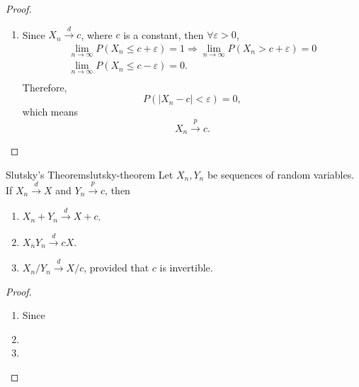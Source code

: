 \begin{proof}
\begin{enumerate}
        By the property of distribution (Theorem \ref{thm:distribution-function-property}), as $\varepsilon\rightarrow 0$, then
        \begin{equation*}
            \lim_{n\rightarrow\infty}F_n(x)=F(x),
        \end{equation*}
        which means,
        \begin{equation*}
            X_n\stackrel{d}{\rightarrow}X.
        \end{equation*}
        \item
        Since $X_{n}\stackrel{d}{\rightarrow}c$, where $c$ is a constant, then $\forall\varepsilon>0$,
        \begin{equation*}
            \begin{gathered}
                \lim_{n\rightarrow\infty}P(X_n\leq c+\varepsilon)=1\Rightarrow\lim_{n\rightarrow\infty}P(X_n>c+\varepsilon)=0\\
                \lim_{n\rightarrow\infty}P(X_n\leq c-\varepsilon)=0.\\
            \end{gathered}
        \end{equation*}
        Therefore,
        \begin{equation*}
            P\left(\left|X_n-c\right|<\varepsilon\right)=0,
        \end{equation*}
        which means
        \begin{equation*}
            X_n\stackrel{p}{\rightarrow}c.
        \end{equation*}
    \end{enumerate}
\end{proof}

\begin{theorem}{Slutsky's Theorem}{slutsky-theorem}
    Let $X_{n}, Y_{n}$ be sequences of random variables. If $X_{n}\stackrel{d}{\rightarrow}X$ and $Y_{n}\stackrel{p}{\rightarrow}c$, then
    \begin{enumerate}
        \item $X_{n}+Y_{n}\stackrel{d}{\rightarrow}X+c$.
        \item $X_{n}Y_{n}\stackrel{d}{\rightarrow}cX$.
        \item $X_{n}/Y_{n}\stackrel{d}{\rightarrow}X/c$, provided that $c$ is invertible.
    \end{enumerate}
\end{theorem}

\begin{proof}
    \begin{enumerate}
        \item
        Since 
        \item

        \item
        
    \end{enumerate}
\end{proof}

